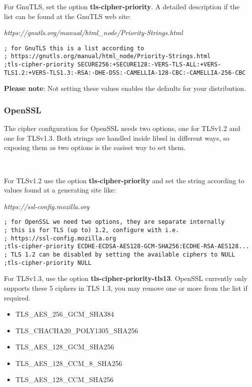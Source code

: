For GnuTLS, set the option \textbf{tls-cipher-priority}. A detailed description if the list can be found at the GnuTLS web site:

\textit{https://gnutls.org/manual/html\_node/Priority-Strings.html}


\begin{verbatim}
; for GnuTLS this is a list according to
; https://gnutls.org/manual/html_node/Priority-Strings.html
;tls-cipher-priority SECURE256:+SECURE128:-VERS-TLS-ALL:+VERS-TLS1.2:+VERS-TLS1.3:-RSA:-DHE-DSS:-CAMELLIA-128-CBC:-CAMELLIA-256-CBC
\end{verbatim}

\textbf{Please note}: Not setting these values enables the defaults for your distribution.

\subsubsection{OpenSSL}

The cipher configuration for OpenSSL needs two options, one for TLSv1.2 and one for TLSv1.3. Both strings are handled inside libssl in different ways, so exposing them as two options is the easiest way to set them.

~

For TLSv1.2 use the option \textbf{tls-cipher-priority} and set the string according to values found at a generating site like:

\textit{https://ssl-config.mozilla.org}

\begin{verbatim}
; for OpenSSL we need two options, they are separate internally
; this is for TLS (up to) 1.2, configure with i.e.
; https://ssl-config.mozilla.org
;tls-cipher-priority ECDHE-ECDSA-AES128-GCM-SHA256:ECDHE-RSA-AES128...
; TLS 1.2 can be disabled by setting the available ciphers to NULL
;tls-cipher-priority NULL
\end{verbatim}

For TLSv1.3, use the option \textbf{tls-cipher-priority-tls13}.
OpenSSL currently only supports these 5 ciphers in TLS 1.3, you may remove one or more from the list if required.

\begin{itemize}
	\itemsep0em
	\item TLS\_AES\_256\_GCM\_SHA384
	\item TLS\_CHACHA20\_POLY1305\_SHA256
	\item TLS\_AES\_128\_GCM\_SHA256
	\item TLS\_AES\_128\_CCM\_8\_SHA256
	\item TLS\_AES\_128\_CCM\_SHA256
\end{itemize}


